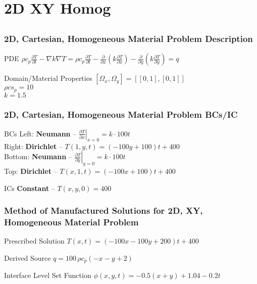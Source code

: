 \documentclass[]{beamer}
\begin{document}
\section{2D XY Homog}
\subsection{}
\begin{frame}[t]\frametitle{2D, Cartesian, Homogeneous Material Problem Description}
  \begin{block}{PDE}
    $\rho c_p\frac{\partial T}{\partial t} - \nabla k \nabla T = 
    \rho c_p\frac{\partial T}{\partial t} - \frac{\partial}{\partial x}
    \left(k\frac{\partial T}{\partial x}\right) - \frac{\partial}{\partial y}
    \left(k\frac{\partial T}{\partial y}\right)= q$
  \end{block}
  
  \begin{block}{Domain/Material Properties}
  	$[\Omega_x,\Omega_y] = [[0,1],[0,1]]$ \\
  	$\rho cs_p = 10$ \\
  	$k=1.5$
  \end{block}
\end{frame}
  
\begin{frame}[t]\frametitle{2D, Cartesian, Homogeneous Material Problem BCs/IC}
  \begin{block}{BCs}
    Left: \textbf{Neumann} -- $\left. \frac{\partial T}{\partial x}\right|_{x=0} = k\cdot 100t$ \\
    Right: \textbf{Dirichlet} -- $T(1,y,t) = (-100y + 100)t +400$ \\
    Bottom: \textbf{Neumann} -- $\left. \frac{\partial T}{\partial y}\right|_{y=0} = k\cdot 100t$ \\
    Top: \textbf{Dirichlet} -- $T(x,1,t) = (-100x + 100)t + 400 $
  \end{block}
  
  \begin{block}{ICs}
    \textbf{Constant} -- $T(x,y,0) = 400$
  \end{block}
\end{frame}

\begin{frame}[t]\frametitle{Method of Manufactured Solutions for 2D, XY, Homogeneous Material Problem}
  \begin{block}{Prescribed Solution}
    $T(x,t) = (-100x-100y+200)t + 400$
  \end{block}
  
  \begin{block}{Derived Source}
  $q = 100\,\rho c_p \left(-x-y+2\right)$
  \end{block}
  
  \begin{block}{Interface Level Set Function}
    $\phi(x,y,t) = -0.5(x+y) + 1.04 - 0.2t$
  \end{block}
\end{frame}
\end{document}
